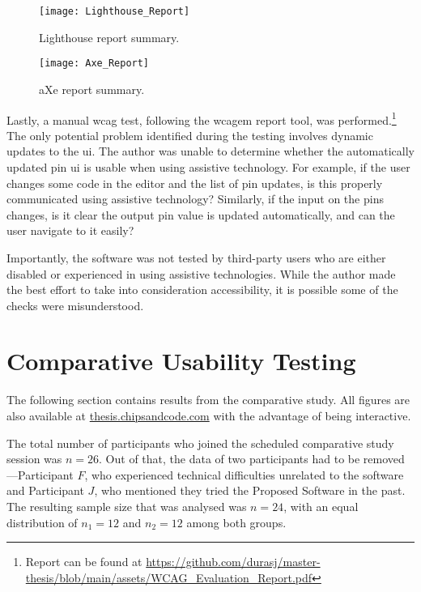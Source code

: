 \begin{figure}[H]
    \texttt{[image: Lighthouse\_Report]}
    \caption{Lighthouse report summary.}
    \label{fig:lighthouse-report}
\end{figure}

\begin{figure}[H]
    \texttt{[image: Axe\_Report]}
    \caption{aXe report summary.}
    \label{fig:axe-report}
\end{figure}

Lastly, a manual \gls{wcag} test, following the \gls{wcagem} report tool, was performed.\footnote{Report can be found at \url{https://github.com/durasj/master-thesis/blob/main/assets/WCAG_Evaluation_Report.pdf}}
The only potential problem identified during the testing involves dynamic updates to the \gls{ui}.
The author was unable to determine whether the automatically updated pin \gls{ui} is usable when using assistive technology.
For example, if the user changes some code in the editor and the list of pin updates, is this properly communicated using assistive technology?
Similarly, if the input on the pins changes, is it clear the output pin value is updated automatically, and can the user navigate to it easily?

Importantly, the software was not tested by third-party users who are either disabled or experienced in using assistive technologies.
While the author made the best effort to take into consideration accessibility, it is possible some of the checks were misunderstood.

\section{Comparative Usability Testing}
\label{Evaluation-UX}

The following section contains results from the comparative study.
All figures are also available at \href{https://thesis.chipsandcode.com}{thesis.chipsandcode.com} with the advantage of being interactive.

The total number of participants who joined the scheduled comparative study session was $n=26$.
Out of that, the data of two participants had to be removed---Participant $F$, who experienced technical difficulties unrelated to the software and Participant $J$, who mentioned they tried the Proposed Software in the past.
The resulting sample size that was analysed was $n=24$, with an equal distribution of $n_1=12$ and $n_2=12$ among both groups.

